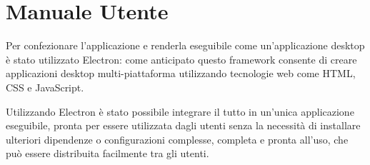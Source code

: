 \section{Manuale Utente}
Per confezionare l'applicazione e renderla eseguibile come un'applicazione desktop è 
stato utilizzato Electron: come anticipato questo framework consente di creare applicazioni 
desktop multi-piattaforma utilizzando tecnologie web come HTML, CSS e JavaScript.

Utilizzando Electron è stato possibile integrare il tutto in un'unica applicazione eseguibile, 
pronta per essere utilizzata dagli utenti senza la necessità di installare ulteriori dipendenze o configurazioni complesse, 
completa e pronta all'uso, che può essere distribuita facilmente tra gli utenti.